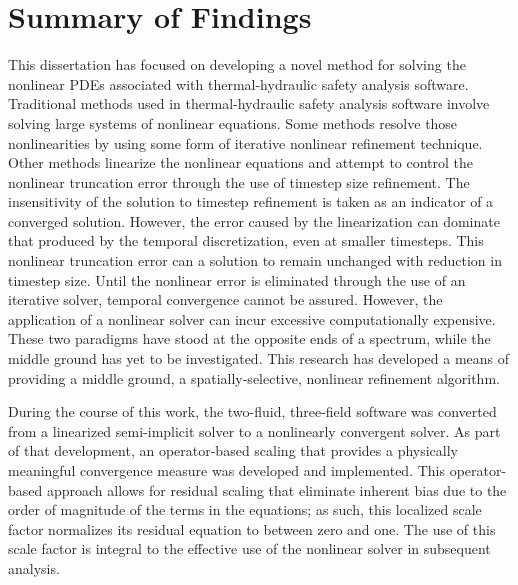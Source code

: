 \chapter{Summary of Findings}
\label{chap:end}

This dissertation has focused on developing a novel method for solving the nonlinear PDEs associated with thermal-hydraulic safety analysis software.
Traditional methods used in thermal-hydraulic safety analysis software involve solving large systems of nonlinear equations.
Some methods resolve those nonlinearities by using some form of iterative nonlinear refinement technique.
Other methods linearize the nonlinear equations and attempt to control the nonlinear truncation error through the use of timestep size refinement.
The insensitivity of the solution to timestep refinement is taken as an indicator of a converged solution. 
However, the error caused by the linearization can dominate that produced by the temporal discretization, even at smaller timesteps.
This nonlinear truncation error can a solution to remain unchanged with reduction in timestep size.
Until the nonlinear error is eliminated through the use of an iterative solver, temporal convergence cannot be assured.
However, the application of a nonlinear solver can incur excessive computationally expensive.
These two paradigms have stood at the opposite ends of a spectrum, while the middle ground has yet to be investigated.
This research has developed a means of providing a middle ground, a spatially-selective, nonlinear refinement algorithm.

During the course of this work, the two-fluid, three-field software \cobra{} was converted from a linearized semi-implicit solver to a nonlinearly convergent solver.
As part of that development, an operator-based scaling that provides a physically meaningful convergence measure was developed and implemented.
This operator-based approach allows for residual scaling that eliminate inherent bias due to the order of magnitude of the terms in the equations; as such, this localized scale factor normalizes its residual equation to between zero and one.
The use of this scale factor is integral to the effective use of the nonlinear solver in subsequent analysis.

